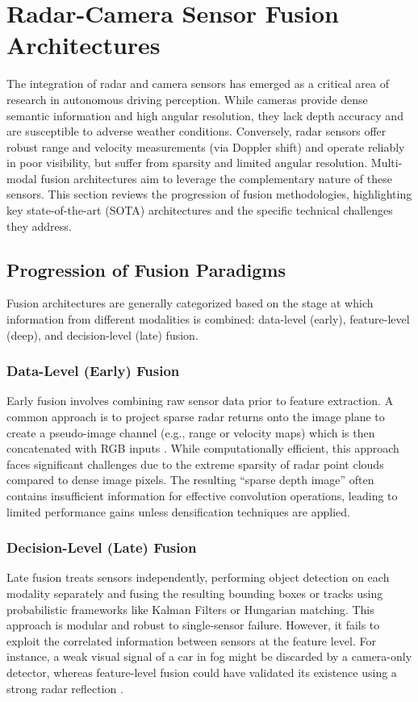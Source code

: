 \section{Radar-Camera Sensor Fusion Architectures}

The integration of radar and camera sensors has emerged as a critical area of research in autonomous driving perception. While cameras provide dense semantic information and high angular resolution, they lack depth accuracy and are susceptible to adverse weather conditions. Conversely, radar sensors offer robust range and velocity measurements (via Doppler shift) and operate reliably in poor visibility, but suffer from sparsity and limited angular resolution. Multi-modal fusion architectures aim to leverage the complementary nature of these sensors. This section reviews the progression of fusion methodologies, highlighting key state-of-the-art (SOTA) architectures and the specific technical challenges they address.

\subsection{Progression of Fusion Paradigms}

Fusion architectures are generally categorized based on the stage at which information from different modalities is combined: data-level (early), feature-level (deep), and decision-level (late) fusion.

\subsubsection{Data-Level (Early) Fusion}
Early fusion involves combining raw sensor data prior to feature extraction. A common approach is to project sparse radar returns onto the image plane to create a pseudo-image channel (e.g., range or velocity maps) which is then concatenated with RGB inputs \cite{Chadwick2019}. While computationally efficient, this approach faces significant challenges due to the extreme sparsity of radar point clouds compared to dense image pixels. The resulting ``sparse depth image'' often contains insufficient information for effective convolution operations, leading to limited performance gains unless densification techniques are applied.

\subsubsection{Decision-Level (Late) Fusion}
Late fusion treats sensors independently, performing object detection on each modality separately and fusing the resulting bounding boxes or tracks using probabilistic frameworks like Kalman Filters or Hungarian matching. This approach is modular and robust to single-sensor failure. However, it fails to exploit the correlated information between sensors at the feature level. For instance, a weak visual signal of a car in fog might be discarded by a camera-only detector, whereas feature-level fusion could have validated its existence using a strong radar reflection \cite{Meyer2019}.

